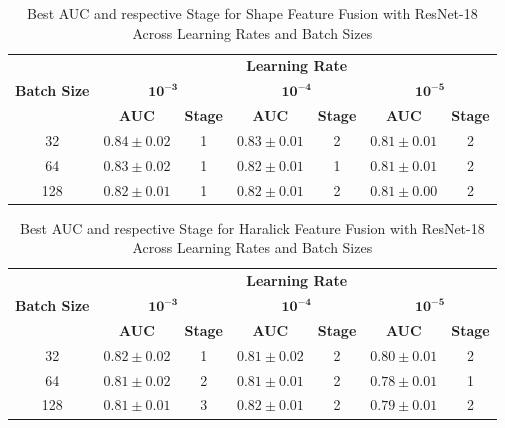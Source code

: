 \begin{table}[htbp]
  \centering
  \caption[Best AUC and Stage for Shape Fusion]{Best AUC and respective Stage for Shape Feature Fusion with ResNet-18 Across Learning Rates and Batch Sizes}
  \label{tab:2dshape_hyperparam}
  \begin{tabular}{@{} c *{3}{cc} @{}}
    \toprule
    & \multicolumn{6}{c}{\textbf{Learning Rate}} \\
    \cmidrule(lr){2-7}
    \textbf{Batch Size}
      & \multicolumn{2}{c}{\(\mathbf{10^{-3}}\)}
      & \multicolumn{2}{c}{\(\mathbf{10^{-4}}\)}
      & \multicolumn{2}{c}{\(\mathbf{10^{-5}}\)} \\
    \cmidrule(lr){2-3} \cmidrule(lr){4-5} \cmidrule(lr){6-7}
    & \textbf{AUC} & \textbf{Stage}
      & \textbf{AUC} & \textbf{Stage}
      & \textbf{AUC} & \textbf{Stage} \\
    \midrule
    32  
      & \textbf{$0.84\pm0.02$} & 1 
      & \textbf{$0.83\pm0.01$} & 2 
      & $0.81\pm0.01$ & 2 \\
    64  
      & $0.83\pm0.02$ & 1 
      & $0.82\pm0.01$ & 1 
      & $0.81\pm0.01$ & 2 \\
    128 
      & $0.82\pm0.01$ & 1 
      & $0.82\pm0.01$ & 2 
      & \textbf{$0.81\pm0.00$} & 2 \\
    \bottomrule
  \end{tabular}
\end{table}

\begin{table}[htbp]
  \centering
  \caption[Best AUC and Stage for Haralick Fusion]{Best AUC and respective Stage for Haralick Feature Fusion with ResNet-18 Across Learning Rates and Batch Sizes}
  \label{tab:haralick_hyperparam}
  \begin{tabular}{@{} c *{3}{cc} @{}}
    \toprule
    & \multicolumn{6}{c}{\textbf{Learning Rate}} \\
    \cmidrule(lr){2-7}
    \textbf{Batch Size}
      & \multicolumn{2}{c}{\(\mathbf{10^{-3}}\)}
      & \multicolumn{2}{c}{\(\mathbf{10^{-4}}\)}
      & \multicolumn{2}{c}{\(\mathbf{10^{-5}}\)} \\
    \cmidrule(lr){2-3} \cmidrule(lr){4-5} \cmidrule(lr){6-7}
    & \textbf{AUC} & \textbf{Stage}
      & \textbf{AUC} & \textbf{Stage}
      & \textbf{AUC} & \textbf{Stage} \\
    \midrule
    32  
      & \textbf{$0.82\pm0.02$} & 1 
      & $0.81\pm0.02$ & 2 
      & \textbf{$0.80\pm0.01$} & 2 \\
    64  
      & $0.81\pm0.02$ & 2 
      & $0.81\pm0.01$ & 2 
      & $0.78\pm0.01$ & 1 \\
    128 
      & $0.81\pm0.01$ & 3 
      & \textbf{$0.82\pm0.01$} & 2 
      & $0.79\pm0.01$ & 2 \\
    \bottomrule
  \end{tabular}
\end{table}

